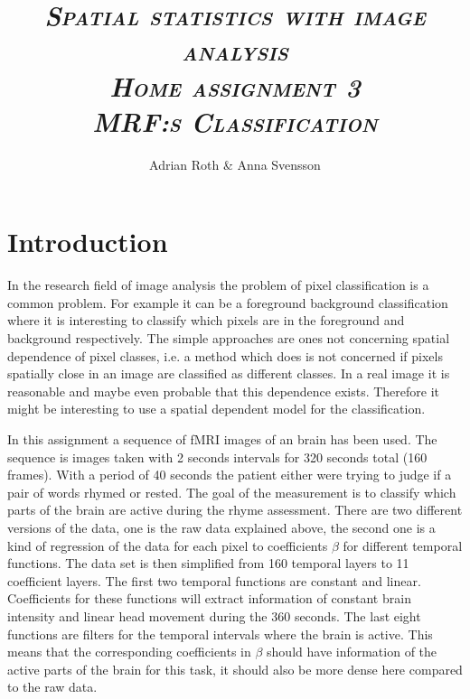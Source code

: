 \documentclass[a4paper,english]{article}
\begin{document}
\afterpage{\cfoot{\thepage}}

\title{\textit{{\textbf{\textsc{Spatial statistics with image analysis  \\ Home assignment 3 \\  MRF:s Classification}}}}}

\author{Adrian Roth \& Anna Svensson}

\maketitle
\thispagestyle{empty}



\pagebreak{}

\thispagestyle{empty}

\pagebreak{}

\section{Introduction}
In the research field of image analysis the problem of pixel classification is a common problem.
For example it can be a foreground background classification where it is interesting to classify which pixels are in the foreground and background respectively.
The simple approaches are ones not concerning spatial dependence of pixel classes, i.e. a method which does is not concerned if pixels spatially close in an image are classified as different classes.
In a real image it is reasonable and maybe even probable that this dependence exists.
Therefore it might be interesting to use a spatial dependent model for the classification.

In this assignment a sequence of fMRI images of an brain has been used.
The sequence is images taken with 2 seconds intervals for 320 seconds total (160 frames).
With a period of 40 seconds the patient either were trying to judge if a pair of words rhymed or rested.
The goal of the measurement is to classify which parts of the brain are active during the rhyme assessment.
There are two different versions of the data, one is the raw data explained above, the second one is a kind of regression of the data for each pixel to coefficients $\beta$ for different temporal functions.
The data set is then simplified from 160 temporal layers to 11 coefficient layers.
The first two temporal functions are constant and linear.
Coefficients for these functions will extract information of constant brain intensity and linear head movement during the 360 seconds.
The last eight functions are filters for the temporal intervals where the brain is active.
This means that the corresponding coefficients in $\beta$ should have information of the active parts of the brain for this task, it should also be more dense here compared to the raw data.
\end{document}
